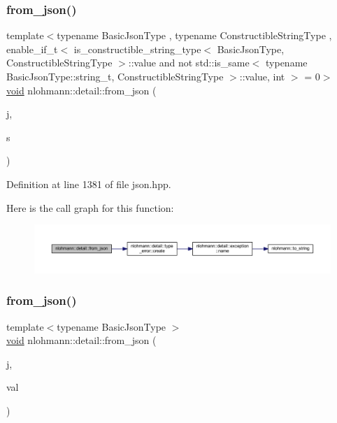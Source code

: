 \subsubsection{\texorpdfstring{from\_json()}{from\_json()}\hspace{0.1cm}{\footnotesize\ttfamily [4/18]}}
{\footnotesize\ttfamily template$<$typename Basic\+Json\+Type , typename Constructible\+String\+Type , enable\+\_\+if\+\_\+t$<$ is\+\_\+constructible\+\_\+string\+\_\+type$<$ Basic\+Json\+Type, Constructible\+String\+Type $>$\+::value and not std\+::is\+\_\+same$<$ typename Basic\+Json\+Type\+::string\+\_\+t, Constructible\+String\+Type $>$\+::value, int $>$  = 0$>$ \\
\mbox{\hyperlink{namespacenlohmann_1_1detail_a59fca69799f6b9e366710cb9043aa77d}{void}} nlohmann\+::detail\+::from\+\_\+json (\begin{DoxyParamCaption}\item[{const Basic\+Json\+Type \&}]{j,  }\item[{Constructible\+String\+Type \&}]{s }\end{DoxyParamCaption})}



Definition at line 1381 of file json.\+hpp.

Here is the call graph for this function\+:
\nopagebreak
\begin{figure}[H]
\begin{center}
\leavevmode
\includegraphics[width=350pt]{namespacenlohmann_1_1detail_a2932f2bc2943dac6d51669312f4fc0f5_cgraph}
\end{center}
\end{figure}
\mbox{\label{namespacenlohmann_1_1detail_a7cb5dd7d46a60e65f9a8e0873b3f7dd8}} 
\subsubsection{\texorpdfstring{from\_json()}{from\_json()}\hspace{0.1cm}{\footnotesize\ttfamily [5/18]}}
{\footnotesize\ttfamily template$<$typename Basic\+Json\+Type $>$ \\
\mbox{\hyperlink{namespacenlohmann_1_1detail_a59fca69799f6b9e366710cb9043aa77d}{void}} nlohmann\+::detail\+::from\+\_\+json (\begin{DoxyParamCaption}\item[{const Basic\+Json\+Type \&}]{j,  }\item[{typename Basic\+Json\+Type\+::number\+\_\+float\+\_\+t \&}]{val }\end{DoxyParamCaption})}



